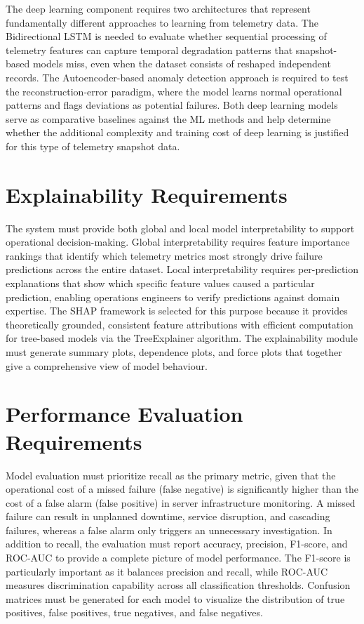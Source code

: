 \documentclass[12pt,letterpaper]{report}
\begin{document}
The deep learning component requires two architectures that represent fundamentally different approaches to learning from telemetry data. The Bidirectional LSTM is needed to evaluate whether sequential processing of telemetry features can capture temporal degradation patterns that snapshot-based models miss, even when the dataset consists of reshaped independent records. The Autoencoder-based anomaly detection approach is required to test the reconstruction-error paradigm, where the model learns normal operational patterns and flags deviations as potential failures. Both deep learning models serve as comparative baselines against the ML methods and help determine whether the additional complexity and training cost of deep learning is justified for this type of telemetry snapshot data.

\section{Explainability Requirements}

The system must provide both global and local model interpretability to support operational decision-making. Global interpretability requires feature importance rankings that identify which telemetry metrics most strongly drive failure predictions across the entire dataset. Local interpretability requires per-prediction explanations that show which specific feature values caused a particular prediction, enabling operations engineers to verify predictions against domain expertise. The SHAP framework is selected for this purpose because it provides theoretically grounded, consistent feature attributions with efficient computation for tree-based models via the TreeExplainer algorithm. The explainability module must generate summary plots, dependence plots, and force plots that together give a comprehensive view of model behaviour.

\section{Performance Evaluation Requirements}

Model evaluation must prioritize recall as the primary metric, given that the operational cost of a missed failure (false negative) is significantly higher than the cost of a false alarm (false positive) in server infrastructure monitoring. A missed failure can result in unplanned downtime, service disruption, and cascading failures, whereas a false alarm only triggers an unnecessary investigation. In addition to recall, the evaluation must report accuracy, precision, F1-score, and ROC-AUC to provide a complete picture of model performance. The F1-score is particularly important as it balances precision and recall, while ROC-AUC measures discrimination capability across all classification thresholds. Confusion matrices must be generated for each model to visualize the distribution of true positives, false positives, true negatives, and false negatives.
\end{document}
